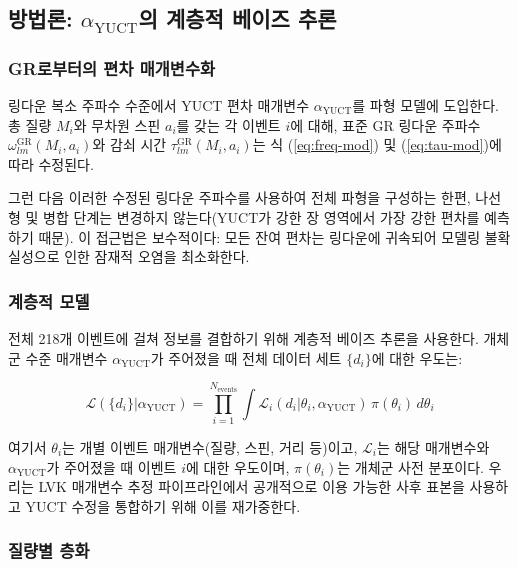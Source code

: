 \documentclass[11pt,a4paper]{article}
\theoremstyle{remark}
\begin{document}
	\subsection{방법론: $\alpha_{\text{YUCT}}$의 계층적 베이즈 추론}
	
	\subsubsection{GR로부터의 편차 매개변수화}
	
	링다운 복소 주파수 수준에서 YUCT 편차 매개변수 $\alpha_{\text{YUCT}}$를 파형 모델에 도입한다. 총 질량 $M_i$와 무차원 스핀 $a_i$를 갖는 각 이벤트 $i$에 대해, 표준 GR 링다운 주파수 $\omega_{lm}^{\text{GR}}(M_i, a_i)$와 감쇠 시간 $\tau_{lm}^{\text{GR}}(M_i, a_i)$는 식 (\ref{eq:freq-mod}) 및 (\ref{eq:tau-mod})에 따라 수정된다.
	
	그런 다음 이러한 수정된 링다운 주파수를 사용하여 전체 파형을 구성하는 한편, 나선형 및 병합 단계는 변경하지 않는다(YUCT가 강한 장 영역에서 가장 강한 편차를 예측하기 때문). 이 접근법은 보수적이다: 모든 잔여 편차는 링다운에 귀속되어 모델링 불확실성으로 인한 잠재적 오염을 최소화한다.
	
	\subsubsection{계층적 모델}
	
	전체 218개 이벤트에 걸쳐 정보를 결합하기 위해 계층적 베이즈 추론을 사용한다. 개체군 수준 매개변수 $\alpha_{\text{YUCT}}$가 주어졌을 때 전체 데이터 세트 $\{d_i\}$에 대한 우도는:
	
	\begin{equation}
		\mathcal{L}(\{d_i\} | \alpha_{\text{YUCT}}) = \prod_{i=1}^{N_{\text{events}}} \int \mathcal{L}_i(d_i | \theta_i, \alpha_{\text{YUCT}}) \, \pi(\theta_i) \, d\theta_i
		\label{eq:hierarchical}
	\end{equation}
	
	여기서 $\theta_i$는 개별 이벤트 매개변수(질량, 스핀, 거리 등)이고, $\mathcal{L}_i$는 해당 매개변수와 $\alpha_{\text{YUCT}}$가 주어졌을 때 이벤트 $i$에 대한 우도이며, $\pi(\theta_i)$는 개체군 사전 분포이다. 우리는 LVK 매개변수 추정 파이프라인에서 공개적으로 이용 가능한 사후 표본을 사용하고 YUCT 수정을 통합하기 위해 이를 재가중한다.
	
	\subsubsection{질량별 층화}
	
\end{document}
